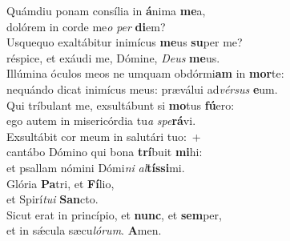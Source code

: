 \evenverse Quámdiu ponam consília in \textbf{á}nima \textbf{me}a,~\*\\
\evenverse dolórem in corde me\textit{o} \textit{per} \textbf{di}em?\\
\oddverse Usquequo exaltábitur inimícus \textbf{me}us \textbf{su}per me?~\*\\
\oddverse réspice, et exáudi me, Dómine, \textit{De}\textit{us} \textbf{me}us.\\
\evenverse Illúmina óculos meos ne umquam obdórmi\textbf{am} in \textbf{mor}te:~\*\\
\evenverse nequándo dicat inimícus meus: præválui ad\textit{vér}\textit{sus} \textbf{e}um.\\
\oddverse Qui tríbulant me, exsultábunt si \textbf{mo}tus \textbf{fú}ero:~\*\\
\oddverse ego autem in misericórdia tu\textit{a} \textit{spe}\textbf{rá}vi.\\
\evenverse Exsultábit cor meum in salutári tuo:~+\\
\evenverse  cantábo Dómino qui bona \textbf{trí}buit \textbf{mi}hi:~\*\\
\evenverse et psallam nómini Dómi\textit{ni} \textit{al}\textbf{tís}\textbf{si}mi.\\
\oddverse Glória \textbf{Pa}tri, et \textbf{Fí}lio,~\*\\
\oddverse et Spirí\textit{tu}\textit{i} \textbf{San}cto.\\
\evenverse Sicut erat in princípio, et \textbf{nunc}, et \textbf{sem}per,~\*\\
\evenverse et in sǽcula sæcu\textit{ló}\textit{rum}. \textbf{A}men.\\
